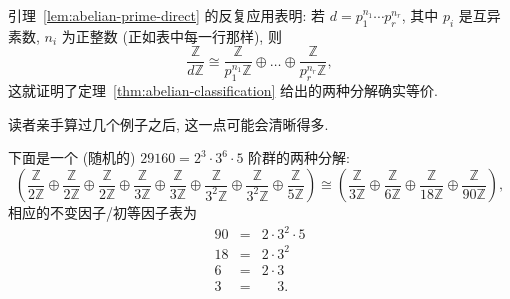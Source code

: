 引理~\ref{lem:abelian-prime-direct} 的反复应用表明: 若 $d = p_1^{n_1} \cdots p_r^{n_r}$, 其中 $p_i$ 是互异素数, $n_i$ 为正整数 (正如表中每一行那样), 则
\[
\frac{\mathbb{Z}}{d\mathbb{Z}} \cong \frac{\mathbb{Z}}{p_1^{n_1}\mathbb{Z}} \oplus \dots \oplus \frac{\mathbb{Z}}{p_r^{n_r}\mathbb{Z}},
\]
这就证明了定理~\ref{thm:abelian-classification} 给出的两种分解确实等价.

读者亲手算过几个例子之后, 这一点可能会清晰得多.

\begin{example}
\label{ex:abelian-order-29160}
下面是一个 (随机的) $29160 = 2^3 \cdot 3^6 \cdot 5$ 阶群的两种分解:
\[
\left(\frac{\mathbb{Z}}{2\mathbb{Z}} \oplus \frac{\mathbb{Z}}{2\mathbb{Z}} \oplus \frac{\mathbb{Z}}{2\mathbb{Z}} \oplus \frac{\mathbb{Z}}{3\mathbb{Z}} \oplus \frac{\mathbb{Z}}{3\mathbb{Z}} \oplus \frac{\mathbb{Z}}{3^2\mathbb{Z}} \oplus \frac{\mathbb{Z}}{3^2\mathbb{Z}} \oplus \frac{\mathbb{Z}}{5\mathbb{Z}}\right)
\cong
\left(\frac{\mathbb{Z}}{3\mathbb{Z}} \oplus \frac{\mathbb{Z}}{6\mathbb{Z}} \oplus \frac{\mathbb{Z}}{18\mathbb{Z}} \oplus \frac{\mathbb{Z}}{90\mathbb{Z}}\right),
\]
相应的不变因子/初等因子表为
\[
\begin{array}{rcl}
90 &=& 2 \cdot 3^2 \cdot 5 \\
18 &=& 2 \cdot 3^2 \\
6  &=& 2 \cdot 3 \\
3  &=& \phantom{2 \cdot{}} 3.
\end{array}
\]
\end{example}

